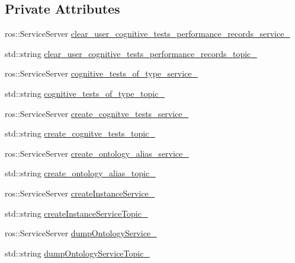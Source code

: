 \subsection*{Private Attributes}
\begin{DoxyCompactItemize}
\item 
ros\-::\-Service\-Server \hyperlink{classKnowrobWrapperCommunications_afc3b9e19e7d950f62dd29222a779ea30}{clear\-\_\-user\-\_\-cognitive\-\_\-tests\-\_\-performance\-\_\-records\-\_\-service\-\_\-}
\item 
std\-::string \hyperlink{classKnowrobWrapperCommunications_ac555026ed985ed7cc020b1f0c33ae054}{clear\-\_\-user\-\_\-cognitive\-\_\-tests\-\_\-performance\-\_\-records\-\_\-topic\-\_\-}
\item 
ros\-::\-Service\-Server \hyperlink{classKnowrobWrapperCommunications_ac2498f2732057c72fc4bbc0ffcb29c7b}{cognitive\-\_\-tests\-\_\-of\-\_\-type\-\_\-service\-\_\-}
\item 
std\-::string \hyperlink{classKnowrobWrapperCommunications_a40ffe00f1d833232faf6d265bd5276b8}{cognitive\-\_\-tests\-\_\-of\-\_\-type\-\_\-topic\-\_\-}
\item 
ros\-::\-Service\-Server \hyperlink{classKnowrobWrapperCommunications_a835254476d15a2c224069d4ff5ae0ce5}{create\-\_\-cognitve\-\_\-tests\-\_\-service\-\_\-}
\item 
std\-::string \hyperlink{classKnowrobWrapperCommunications_ab90753196ac931da226e940346162255}{create\-\_\-cognitve\-\_\-tests\-\_\-topic\-\_\-}
\item 
ros\-::\-Service\-Server \hyperlink{classKnowrobWrapperCommunications_a522e95f339e854d9202d212885cd542e}{create\-\_\-ontology\-\_\-alias\-\_\-service\-\_\-}
\item 
std\-::string \hyperlink{classKnowrobWrapperCommunications_ae3bf27737520a9ee4ce0ec43bffb15e4}{create\-\_\-ontology\-\_\-alias\-\_\-topic\-\_\-}
\item 
ros\-::\-Service\-Server \hyperlink{classKnowrobWrapperCommunications_a2be003e4372235aba8c48f08ee160bdb}{create\-Instance\-Service\-\_\-}
\item 
std\-::string \hyperlink{classKnowrobWrapperCommunications_ae4d64655c9da3ad80b79197f7cc761ef}{create\-Instance\-Service\-Topic\-\_\-}
\item 
ros\-::\-Service\-Server \hyperlink{classKnowrobWrapperCommunications_af0ad3b846b7441ed1256ab14501689dc}{dump\-Ontology\-Service\-\_\-}
\item 
std\-::string \hyperlink{classKnowrobWrapperCommunications_a581d7bbfc90299d80e504c59df83510d}{dump\-Ontology\-Service\-Topic\-\_\-}

\end{DoxyCompactItemize}
